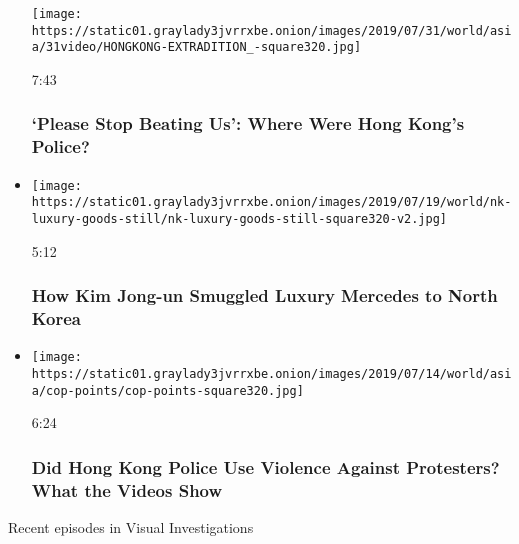 \begin{itemize}
  \texttt{[image: https://static01.graylady3jvrrxbe.onion/images/2019/07/31/world/asia/31video/HONGKONG-EXTRADITION\_-square320.jpg]}

  7:43

  \hypertarget{please-stop-beating-us-where-were-hong-kongs-police}{%
  \subsubsection{`Please Stop Beating Us': Where Were Hong Kong's
  Police?}\label{please-stop-beating-us-where-were-hong-kongs-police}}
\item
  \href{https://www.nytimes3xbfgragh.onion/video/world/asia/100000006469635/north-korea-sanctions.html?action=click\&module=video-series-bar\&region=header\&pgtype=Article\&playlistId=video/investigations}{}

  \texttt{[image: https://static01.graylady3jvrrxbe.onion/images/2019/07/19/world/nk-luxury-goods-still/nk-luxury-goods-still-square320-v2.jpg]}

  5:12

  \hypertarget{how-kim-jong-un-smuggled-luxury-mercedes-to-north-korea}{%
  \subsubsection{How Kim Jong-un Smuggled Luxury Mercedes to North
  Korea}\label{how-kim-jong-un-smuggled-luxury-mercedes-to-north-korea}}
\item
  \href{https://www.nytimes3xbfgragh.onion/video/world/asia/100000006602584/hong-kong-police-protest-video-investigation.html?action=click\&module=video-series-bar\&region=header\&pgtype=Article\&playlistId=video/investigations}{}

  \texttt{[image: https://static01.graylady3jvrrxbe.onion/images/2019/07/14/world/asia/cop-points/cop-points-square320.jpg]}

  6:24

  \hypertarget{did-hong-kong-police-use-violence-against-protesters-what-the-videos-show}{%
  \subsubsection{Did Hong Kong Police Use Violence Against Protesters?
  What the Videos
  Show}\label{did-hong-kong-police-use-violence-against-protesters-what-the-videos-show}}
\end{itemize}

Recent episodes in Visual Investigations

